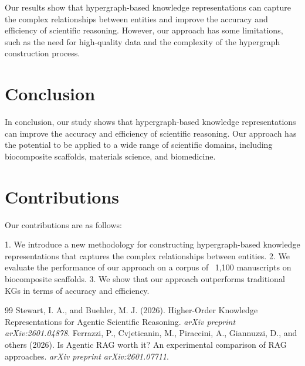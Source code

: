 \documentclass[12pt, a4paper]{article}
\begin{document}
Our results show that hypergraph-based knowledge representations can capture the complex relationships between entities and improve the accuracy and efficiency of scientific reasoning. However, our approach has some limitations, such as the need for high-quality data and the complexity of the hypergraph construction process.

\section{Conclusion}

In conclusion, our study shows that hypergraph-based knowledge representations can improve the accuracy and efficiency of scientific reasoning. Our approach has the potential to be applied to a wide range of scientific domains, including biocomposite scaffolds, materials science, and biomedicine.

\section{Contributions}

Our contributions are as follows:

1.  We introduce a new methodology for constructing hypergraph-based knowledge representations that captures the complex relationships between entities.
2.  We evaluate the performance of our approach on a corpus of ~1,100 manuscripts on biocomposite scaffolds.
3.  We show that our approach outperforms traditional KGs in terms of accuracy and efficiency.

\begin{thebibliography}{99}
 Stewart, I. A., and Buehler, M. J. (2026). Higher-Order Knowledge Representations for Agentic Scientific Reasoning. \textit{arXiv preprint arXiv:2601.04878}.
 Ferrazzi, P., Cvjeticanin, M., Piraccini, A., Giannuzzi, D., and others (2026). Is Agentic RAG worth it? An experimental comparison of RAG approaches. \textit{arXiv preprint arXiv:2601.07711}.
\end{thebibliography}
\end{document}
